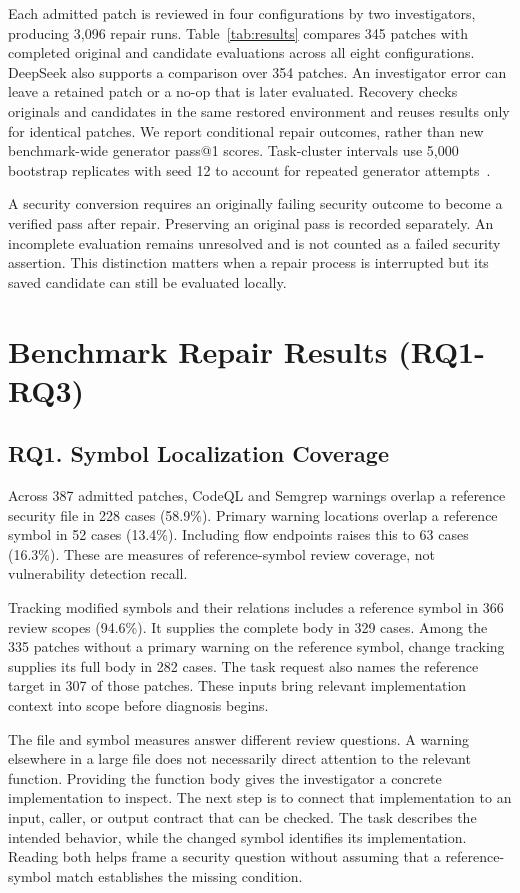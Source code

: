 \documentclass[10pt,conference]{IEEEtran}
\begin{document}
Each admitted patch is reviewed in four configurations by two investigators, producing 3,096 repair runs. Table~\ref{tab:results} compares 345 patches with completed original and candidate evaluations across all eight configurations. DeepSeek also supports a comparison over 354 patches. An investigator error can leave a retained patch or a no-op that is later evaluated. Recovery checks originals and candidates in the same restored environment and reuses results only for identical patches. We report conditional repair outcomes, rather than new benchmark-wide generator pass@1 scores. Task-cluster intervals use 5,000 bootstrap replicates with seed 12 to account for repeated generator attempts~\cite{bootstrap}.

A security conversion requires an originally failing security outcome to become a verified pass after repair. Preserving an original pass is recorded separately. An incomplete evaluation remains unresolved and is not counted as a failed security assertion. This distinction matters when a repair process is interrupted but its saved candidate can still be evaluated locally.

\section{Benchmark Repair Results (RQ1-RQ3)}
\label{sec:results}
\subsection{RQ1. Symbol Localization Coverage}
Across 387 admitted patches, CodeQL and Semgrep warnings overlap a reference security file in 228 cases (58.9\%). Primary warning locations overlap a reference symbol in 52 cases (13.4\%). Including flow endpoints raises this to 63 cases (16.3\%). These are measures of reference-symbol review coverage, not vulnerability detection recall.

Tracking modified symbols and their relations includes a reference symbol in 366 review scopes (94.6\%). It supplies the complete body in 329 cases. Among the 335 patches without a primary warning on the reference symbol, change tracking supplies its full body in 282 cases. The task request also names the reference target in 307 of those patches. These inputs bring relevant implementation context into scope before diagnosis begins.

The file and symbol measures answer different review questions. A warning elsewhere in a large file does not necessarily direct attention to the relevant function. Providing the function body gives the investigator a concrete implementation to inspect. The next step is to connect that implementation to an input, caller, or output contract that can be checked. The task describes the intended behavior, while the changed symbol identifies its implementation. Reading both helps frame a security question without assuming that a reference-symbol match establishes the missing condition.
\end{document}
